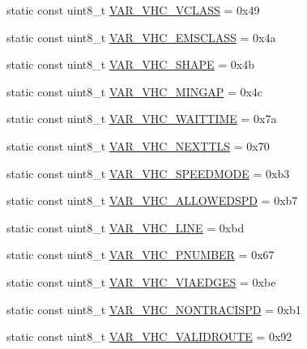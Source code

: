 \begin{DoxyCompactItemize}
\item 
static const uint8\+\_\+t \hyperlink{classtraci__api_1_1_vehicle_manager_ac2ce3790565e9dcaf60c2f10727e6fb5}{V\+A\+R\+\_\+\+V\+H\+C\+\_\+\+V\+C\+L\+A\+SS} = 0x49
\item 
static const uint8\+\_\+t \hyperlink{classtraci__api_1_1_vehicle_manager_a26f3f016ee48aa4f004058253c0699ff}{V\+A\+R\+\_\+\+V\+H\+C\+\_\+\+E\+M\+S\+C\+L\+A\+SS} = 0x4a
\item 
static const uint8\+\_\+t \hyperlink{classtraci__api_1_1_vehicle_manager_a1f99a485df0336dc0be888fe59b1431a}{V\+A\+R\+\_\+\+V\+H\+C\+\_\+\+S\+H\+A\+PE} = 0x4b
\item 
static const uint8\+\_\+t \hyperlink{classtraci__api_1_1_vehicle_manager_ad4456bf8a1da769c826274acb2af6fe9}{V\+A\+R\+\_\+\+V\+H\+C\+\_\+\+M\+I\+N\+G\+AP} = 0x4c
\item 
static const uint8\+\_\+t \hyperlink{classtraci__api_1_1_vehicle_manager_a12d27b67a1efc5a300aa7baed5cdc473}{V\+A\+R\+\_\+\+V\+H\+C\+\_\+\+W\+A\+I\+T\+T\+I\+ME} = 0x7a
\item 
static const uint8\+\_\+t \hyperlink{classtraci__api_1_1_vehicle_manager_a2c78dc01c5fdad2afb13f7f449e36813}{V\+A\+R\+\_\+\+V\+H\+C\+\_\+\+N\+E\+X\+T\+T\+LS} = 0x70
\item 
static const uint8\+\_\+t \hyperlink{classtraci__api_1_1_vehicle_manager_a240c2aecbbf2dd8e024952eae3b79365}{V\+A\+R\+\_\+\+V\+H\+C\+\_\+\+S\+P\+E\+E\+D\+M\+O\+DE} = 0xb3
\item 
static const uint8\+\_\+t \hyperlink{classtraci__api_1_1_vehicle_manager_a726376cb977fae009eca00f5550980ae}{V\+A\+R\+\_\+\+V\+H\+C\+\_\+\+A\+L\+L\+O\+W\+E\+D\+S\+PD} = 0xb7
\item 
static const uint8\+\_\+t \hyperlink{classtraci__api_1_1_vehicle_manager_a226d8c4d5cffe0ce33f5041380589c09}{V\+A\+R\+\_\+\+V\+H\+C\+\_\+\+L\+I\+NE} = 0xbd
\item 
static const uint8\+\_\+t \hyperlink{classtraci__api_1_1_vehicle_manager_a866d82a9f063497d31a0f8e2f6bc9a39}{V\+A\+R\+\_\+\+V\+H\+C\+\_\+\+P\+N\+U\+M\+B\+ER} = 0x67
\item 
static const uint8\+\_\+t \hyperlink{classtraci__api_1_1_vehicle_manager_a56136da0ffaf68882bd8dc513d37ffb2}{V\+A\+R\+\_\+\+V\+H\+C\+\_\+\+V\+I\+A\+E\+D\+G\+ES} = 0xbe
\item 
static const uint8\+\_\+t \hyperlink{classtraci__api_1_1_vehicle_manager_a2d9c7e68c0b180ff0195b6c2a2ca4fd5}{V\+A\+R\+\_\+\+V\+H\+C\+\_\+\+N\+O\+N\+T\+R\+A\+C\+I\+S\+PD} = 0xb1
\item 
static const uint8\+\_\+t \hyperlink{classtraci__api_1_1_vehicle_manager_a4c7692db776fe910195ca4da458e8965}{V\+A\+R\+\_\+\+V\+H\+C\+\_\+\+V\+A\+L\+I\+D\+R\+O\+U\+TE} = 0x92

\end{DoxyCompactItemize}
